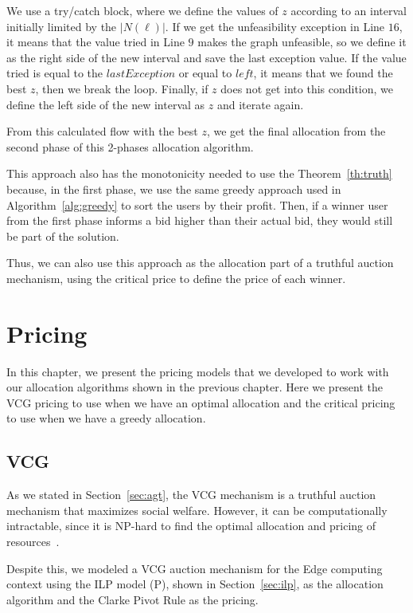 \documentclass[English]{ic-tese-v3}
\begin{document}
We use a try/catch block, where we define the values of $z$ according to an interval initially limited by the $|N(\ell)|$. If we get the unfeasibility exception in Line $16$, it means that the value tried in Line $9$ makes the graph unfeasible, so we define it as the right side of the new interval and save the last exception value. If the value tried is equal to the $lastException$ or equal to $left$, it means that we found the best $z$, then we break the loop. Finally, if $z$ does not get into this condition, we define the left side of the new interval as $z$ and iterate again.

From this calculated flow with the best $z$, we get the final allocation from the second phase of this 2-phases allocation algorithm.

This approach also has the monotonicity needed to use the Theorem~\ref{th:truth} because, in the first phase, we use the same greedy approach used in Algorithm~\ref{alg:greedy} to sort the users by their profit. Then, if a winner user from the first phase informs a bid higher than their actual bid, they would still be part of the solution.

Thus, we can also use this approach as the allocation part of a truthful auction mechanism, using the critical price to define the price of each winner.

\chapter{Pricing}
\label{ch:pricing}
In this chapter, we present the pricing models that we developed to work with our allocation algorithms shown in the previous chapter. Here we present the VCG pricing to use when we have an optimal allocation and the critical pricing to use when we have a greedy allocation.

\section{VCG}
\label{sec:vcg_pricing}
As we stated in Section~\ref{sec:agt}, the VCG mechanism is a truthful auction mechanism that maximizes social welfare. However, it can be computationally intractable, since it is NP-hard to find the optimal allocation and pricing of resources~\cite{ChekuriTruthful2009}.

Despite this, we modeled a VCG auction mechanism for the Edge computing context using the ILP model (P), shown in Section~\ref{sec:ilp}, as the allocation algorithm and the Clarke Pivot Rule as the pricing.
\end{document}
